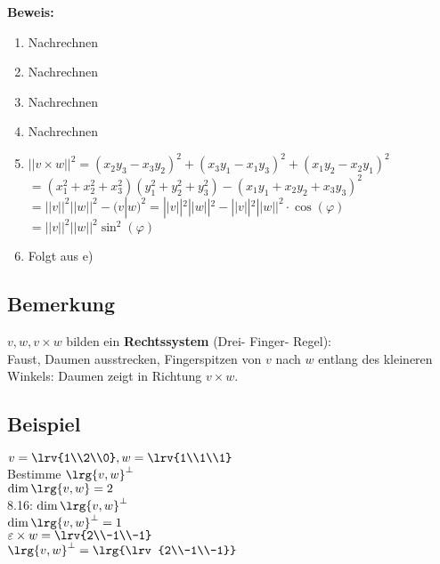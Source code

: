 	\textbf{Beweis:}
	\begin{enumerate}
		\item Nachrechnen
		\item Nachrechnen
		\item Nachrechnen
		\item Nachrechnen
		\item $ ||v\times w||^2=(x_2y_3-x_3y_2)^2+(x_3y_1-x_1y_3)^2+(x_1y_2-x_2y_1)^2 $\\
		$ =(x_1^2+x_2^2+x_3^2)(y_1^2+y_2^2+y_3^2)-(x_1y_1+x_2y_2+x_3y_3)^2 $\\
		$ = ||v||^2 ||w||^2-(v|w)^2=||v||^2||w||^2-||v||^2||w||^2\cdot\cos(\varphi) $\\
		$ = ||v||^2||w||^2\sin^2(\varphi)$
		\item Folgt aus e)
	\end{enumerate}

\subsection{Bemerkung}
	$ v,w,v\times w $ bilden ein \textbf{Rechtssystem} (Drei- Finger- Regel):\\
	Faust, Daumen ausstrecken, Fingerspitzen von $ v $ nach $ w $ entlang des kleineren Winkels: Daumen zeigt in Richtung $ v\times w $.

\subsection{Beispiel}
	$ v=\lrv{1\\2\\0},w=\lrv{1\\1\\1} $\\
	Bestimme $ \lrg{v,w}^\perp $\\
	$ \dim\lrg{v,w}=2 $\\
	8.16: $ \dim\lrg{v,w}^\perp $\\
	$ \dim\lrg{v,w}^\perp=1 $\\
	$ \varepsilon\times w=\lrv{2\\-1\\-1} $\\
	$ \lrg{v,w}^\perp=\lrg{\lrv{2\\-1\\-1}} $
